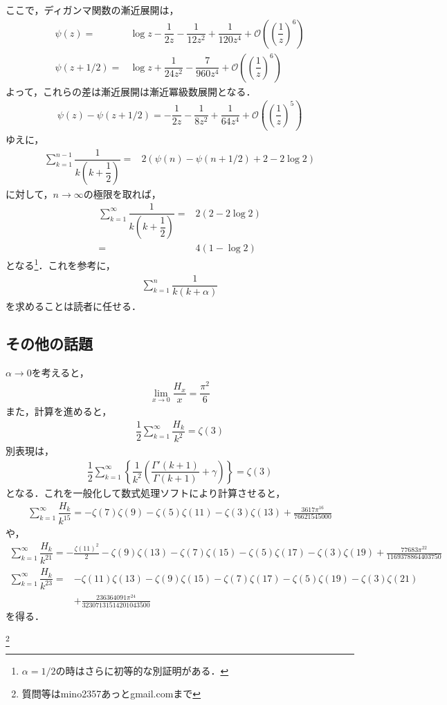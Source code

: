 \documentclass[12pt]{jsarticle}
\begin{document}
ここで，ディガンマ関数の漸近展開は，
\begin{align*}
\psi(z) =& \log z - \dfrac{1}{2z} - \dfrac{1}{12z^2} + \dfrac{1}{120z^4} + \mathcal{O}\left( \left( \dfrac{1}{z} \right)^6 \right) \\
\psi(z+1/2) =& \log z + \dfrac{1}{24z^2} - \dfrac{7}{960z^4} + \mathcal{O}\left( \left( \dfrac{1}{z} \right)^6 \right)
\end{align*}
よって，これらの差は漸近展開は漸近冪級数展開となる．
\begin{align*}
\psi(z) - \psi(z+1/2) = - \dfrac{1}{2z} - \dfrac{1}{8z^2} + \dfrac{1}{64z^4} + \mathcal{O}\left( \left( \dfrac{1}{z} \right)^5 \right)
\end{align*}
ゆえに，
\begin{align*}
\sum_{k=1}^{n-1}\dfrac{1}{k\left(k+\dfrac{1}{2}\right)} =& 2 \left( \psi(n) - \psi\left( n + 1/2 \right) + 2 - 2\log 2 \right)
\end{align*}
に対して，$n \to \infty$の極限を取れば，
\begin{align*}
\sum_{k=1}^{\infty}\dfrac{1}{k\left(k+\dfrac{1}{2}\right)} =& 2 \left( 2 - 2\log 2 \right) \\
=& 4(1 - \log 2)
\end{align*}
となる\footnote{$\alpha=1/2$の時はさらに初等的な別証明がある．}．これを参考に，
\begin{align*}
\sum_{k=1}^{n} \dfrac{1}{k(k+\alpha)}
\end{align*}
を求めることは読者に任せる．
\subsection*{その他の話題}
$\alpha \to 0$を考えると，
\begin{align*}
\lim_{x \to 0}\dfrac{H_{x}}{x} = \dfrac{\pi^2}{6}
\end{align*}
また，計算を進めると，
\begin{align*}
\dfrac{1}{2}\sum_{k=1}^{\infty}\dfrac{H_{k}}{k^2} = \zeta(3)
\end{align*}
別表現は，
\begin{align*}
\dfrac{1}{2}\sum_{k=1}^{\infty} \left\{ \dfrac{1}{k^2}\left( \dfrac{\Gamma'(k+1)}{\Gamma(k+1)} + \gamma \right) \right\} = \zeta(3)
\end{align*}
となる．これを一般化して数式処理ソフトにより計算させると，
\begin{align*}
\sum_{k=1}^{\infty}\dfrac{H_{k}}{k^{15}}=-\zeta (7) \zeta (9)-\zeta (5) \zeta (11)-\zeta (3) \zeta(13)+\frac{3617 \pi ^{16}}{76621545000}
\end{align*}
や，
\begin{align*}
\sum_{k=1}^{\infty}\dfrac{H_{k}}{k^{21}}=-\frac{\zeta (11)^2}{2}-\zeta (9) \zeta (13)-\zeta (7) \zeta (15)-\zeta (5) \zeta(17)-\zeta (3) \zeta (19)+\frac{77683 \pi ^{22}}{1169378864403750}
\end{align*}
\begin{align*}
\sum_{k=1}^{\infty}\dfrac{H_{k}}{k^{23}}=&-\zeta (11) \zeta (13)-\zeta (9) \zeta (15)-\zeta (7) \zeta (17)-\zeta (5) \zeta(19)-\zeta (3) \zeta (21) \\
&+\frac{236364091 \pi ^{24}}{32307131514201043500}
\end{align*}
を得る．

\footnote[0]{
質問等はmino2357あっとgmail.comまで
}

\thispagestyle{empty}
\end{document}
